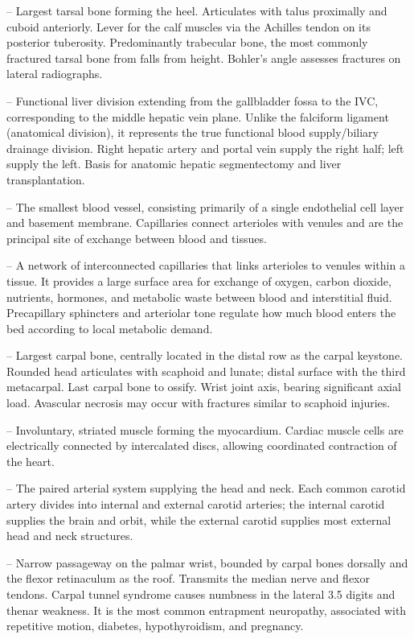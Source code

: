 -- Largest tarsal bone forming the heel. Articulates with talus proximally and cuboid anteriorly. Lever for the calf muscles via the Achilles tendon on its posterior tuberosity. Predominantly trabecular bone, the most commonly fractured tarsal bone from falls from height. Bohler's angle assesses fractures on lateral radiographs.

-- Functional liver division extending from the gallbladder fossa to the IVC, corresponding to the middle hepatic vein plane. Unlike the falciform ligament (anatomical division), it represents the true functional blood supply/biliary drainage division. Right hepatic artery and portal vein supply the right half; left supply the left. Basis for anatomic hepatic segmentectomy and liver transplantation.

-- The smallest blood vessel, consisting primarily of a single endothelial cell layer and basement membrane. Capillaries connect arterioles with venules and are the principal site of exchange between blood and tissues.

-- A network of interconnected capillaries that links arterioles to venules within a tissue. It provides a large surface area for exchange of oxygen, carbon dioxide, nutrients, hormones, and metabolic waste between blood and interstitial fluid. Precapillary sphincters and arteriolar tone regulate how much blood enters the bed according to local metabolic demand.

-- Largest carpal bone, centrally located in the distal row as the carpal keystone. Rounded head articulates with scaphoid and lunate; distal surface with the third metacarpal. Last carpal bone to ossify. Wrist joint axis, bearing significant axial load. Avascular necrosis may occur with fractures similar to scaphoid injuries.

-- Involuntary, striated muscle forming the myocardium. Cardiac muscle cells are electrically connected by intercalated discs, allowing coordinated contraction of the heart.

-- The paired arterial system supplying the head and neck. Each common carotid artery divides into internal and external carotid arteries; the internal carotid supplies the brain and orbit, while the external carotid supplies most external head and neck structures.

-- Narrow passageway on the palmar wrist, bounded by carpal bones dorsally and the flexor retinaculum as the roof. Transmits the median nerve and flexor tendons. Carpal tunnel syndrome causes numbness in the lateral 3.5 digits and thenar weakness. It is the most common entrapment neuropathy, associated with repetitive motion, diabetes, hypothyroidism, and pregnancy.


